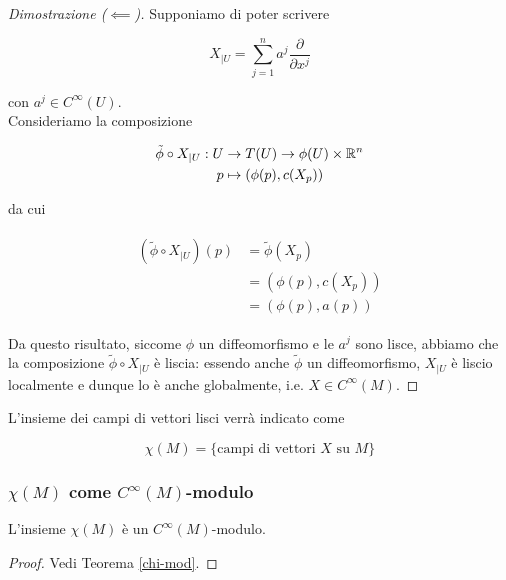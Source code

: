 \begin{proof}[Dimostrazione ($ \impliedby $)]
	Supponiamo di poter scrivere
	
	\begin{equation}
		X_{|U} = \sum_{j=1}^{n} a^{j} \dfrac{\partial}{\partial x^{j}}
	\end{equation}
	
	con $ a^{j} \in C^{\infty}(U) $.\\
	Consideriamo la composizione
	
	\begin{align}
		\begin{split}
			\tilde{\phi} \circ X_{|U} : U &\to T(U) \to \phi(U) \times \mathbb{R}^{n}\\
			p &\mapsto (\phi(p),c(X_{p}))
		\end{split}
	\end{align}

	da cui
	
	\begin{align}
		\begin{split}
			(\tilde{\phi} \circ X_{|U})(p) &= \tilde{\phi}(X_{p})\\
			&= (\phi(p),c(X_{p}))\\
			&= (\phi(p),a(p))
		\end{split}
	\end{align}

	Da questo risultato, siccome $ \phi $  un diffeomorfismo e le $ a^{j} $ sono lisce, abbiamo che la composizione $ \tilde{\phi} \circ X_{|U} $ è liscia: essendo anche $ \tilde{\phi} $ un diffeomorfismo, $ X_{|U} $ è liscio localmente e dunque lo è anche globalmente, i.e. $ X \in C^{\infty}(M) $.
\end{proof}

L'insieme dei campi di vettori lisci verrà indicato come

\begin{equation}
	\chi(M) = \{ \text{campi di vettori } X \text{ su } M \}
\end{equation}

\subsubsection{$ \chi(M) $ come $ C^{\infty}(M) $-modulo}

\begin{definition}
	L'insieme $ \chi(M) $ è un $ C^{\infty}(M) $-modulo.
\end{definition}

\begin{proof}
	Vedi Teorema \ref{chi-mod}.
\end{proof}


